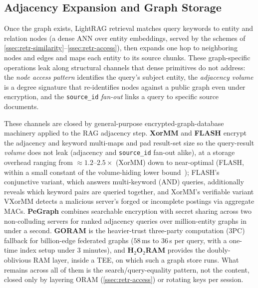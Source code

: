 \subsection{Adjacency Expansion and Graph Storage}
\label{ssec:retr-adjacency}
Once the graph exists, LightRAG retrieval matches query keywords to entity and relation nodes (a
dense ANN over entity embeddings, served by the schemes of
\cref{ssec:retr-similarity}--\cref{ssec:retr-access}), then expands one hop to neighboring nodes
and edges and maps each entity to its source chunks. These graph-specific operations leak along
structural channels that dense primitives do not address: the \emph{node access pattern} identifies
the query's subject entity, the \emph{adjacency volume} is a degree signature that re-identifies
nodes against a public graph even under encryption, and the \texttt{source\_id} \emph{fan-out}
links a query to specific source documents.

These channels are closed by general-purpose encrypted-graph-database machinery applied to the RAG
adjacency step. \textbf{XorMM} and \textbf{FLASH} encrypt the adjacency and keyword multi-maps and
pad result-set size so the query-result \emph{volume} does not leak (adjacency and
\texttt{source\_id} fan-out alike), at a storage overhead ranging from ${\approx}1.2$--$2.5\times$
(XorMM) down to near-optimal (FLASH, within a small constant of the volume-hiding lower bound~\citep{ando_cost_2022});
FLASH's conjunctive variant, which answers multi-keyword (AND) queries, additionally reveals which
keyword pairs are queried together, and XorMM's verifiable variant VXorMM detects a malicious
server's forged or incomplete postings via aggregate MACs. \textbf{PeGraph}
combines searchable encryption with secret sharing across two non-colluding servers for ranked
adjacency queries over million-entity graphs in under a second. \textbf{GORAM} is the
heavier-trust three-party computation (3PC) fallback for billion-edge federated graphs ($58$\,ms to $36$\,s per query, with
a one-time index setup under $3$ minutes), and \textbf{H$_2$O$_2$RAM} provides the doubly-oblivious
RAM layer, inside a TEE, on which such a graph store runs. What remains across all of them is
the search/query-equality pattern, not the content, closed only by layering ORAM
(\cref{ssec:retr-access}) or rotating keys per session.

